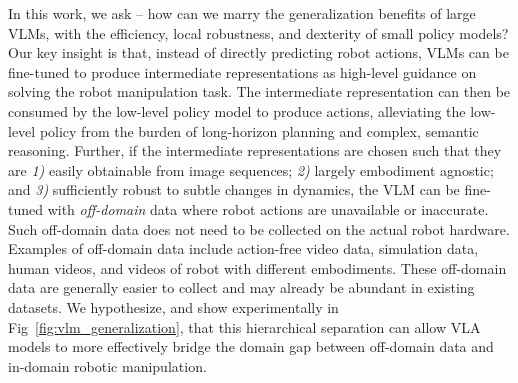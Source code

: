 In this work, we ask -- how can we marry the generalization benefits of large VLMs, with the efficiency, local robustness, and dexterity of small policy models? 
% 
Our key insight is that, instead of directly predicting robot actions, VLMs can be fine-tuned to produce intermediate representations as high-level guidance on solving the robot manipulation task. The intermediate representation can then be consumed by the low-level policy model to produce actions, alleviating the low-level policy from the burden of long-horizon planning and complex, semantic reasoning. Further, if the intermediate representations are chosen such that they are \emph{1)} easily obtainable from image sequences; \emph{2)} largely embodiment agnostic; and \emph{3)} sufficiently robust to subtle changes in dynamics, the VLM can be fine-tuned with \emph{off-domain} data where robot actions are unavailable or inaccurate. Such off-domain data does not need to be collected on the actual robot hardware. Examples of off-domain data include action-free video data, simulation data, human videos, and videos of robot with different embodiments. These off-domain data are generally easier to collect and may already be abundant in existing datasets. We hypothesize, and show experimentally in Fig~\ref{fig:vlm_generalization}, that this hierarchical separation can allow VLA models to more effectively bridge the domain gap between off-domain data and in-domain robotic manipulation. 


